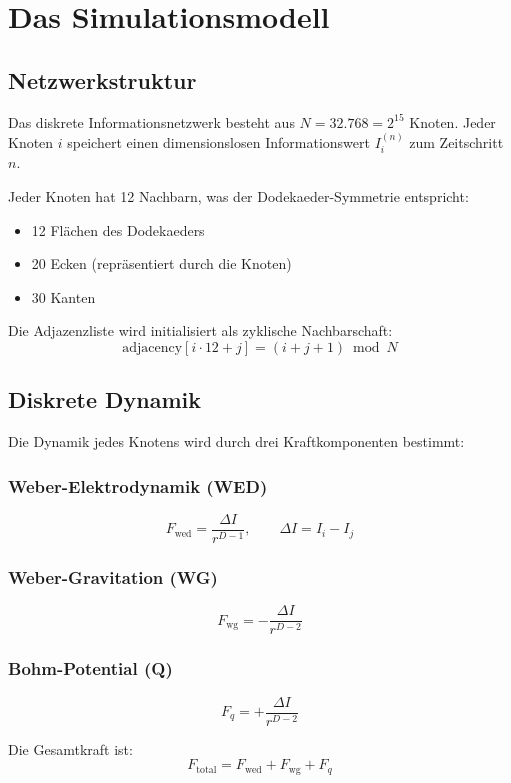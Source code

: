 \documentclass[12pt,a4paper]{article}
\begin{document}
\section{Das Simulationsmodell}

\subsection{Netzwerkstruktur}

Das diskrete Informationsnetzwerk besteht aus $N = 32.768 = 2^{15}$ Knoten. Jeder Knoten $i$ speichert einen dimensionslosen Informationswert $I_i^{(n)}$ zum Zeitschritt $n$.

Jeder Knoten hat 12 Nachbarn, was der Dodekaeder-Symmetrie entspricht:
\begin{itemize}
\item 12 Flächen des Dodekaeders
\item 20 Ecken (repräsentiert durch die Knoten)
\item 30 Kanten
\end{itemize}

Die Adjazenzliste wird initialisiert als zyklische Nachbarschaft:
\[
\text{adjacency}[i \cdot 12 + j] = (i + j + 1) \bmod N
\]

\subsection{Diskrete Dynamik}

Die Dynamik jedes Knotens wird durch drei Kraftkomponenten bestimmt:

\subsubsection{Weber-Elektrodynamik (WED)}
\[
F_{\text{wed}} = \frac{\Delta I}{r^{D-1}}, \qquad \Delta I = I_i - I_j
\]

\subsubsection{Weber-Gravitation (WG)}
\[
F_{\text{wg}} = -\frac{\Delta I}{r^{D-2}}
\]

\subsubsection{Bohm-Potential (Q)}
\[
F_q = +\frac{\Delta I}{r^{D-2}}
\]

Die Gesamtkraft ist:
\[
F_{\text{total}} = F_{\text{wed}} + F_{\text{wg}} + F_q
\]
\end{document}
